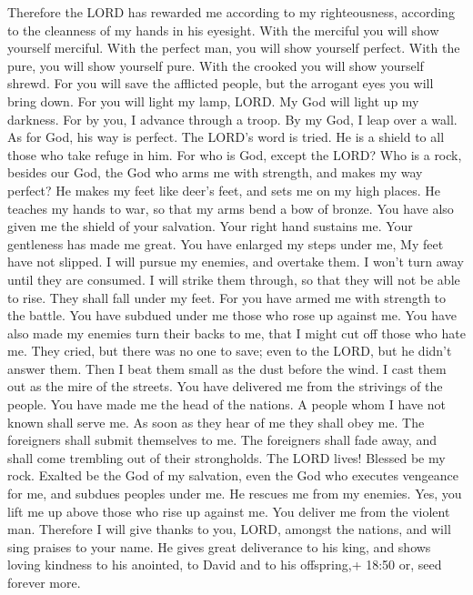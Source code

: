 Therefore the LORD has rewarded me according to my righteousness,
according to the cleanness of my hands in his eyesight. 
With the merciful you will show yourself merciful. With the perfect man,
you will show yourself perfect.  With the pure, you will
show yourself pure. With the crooked you will show yourself shrewd.
 For you will save the afflicted people, but the arrogant
eyes you will bring down.  For you will light my lamp,
LORD. My God will light up my darkness.  For by you, I
advance through a troop. By my God, I leap over a wall.  As
for God, his way is perfect. The LORD's word is tried. He is a shield to
all those who take refuge in him.  For who is God, except
the LORD? Who is a rock, besides our God,  the God who arms
me with strength, and makes my way perfect?  He makes my
feet like deer's feet, and sets me on my high places.  He
teaches my hands to war, so that my arms bend a bow of bronze.
 You have also given me the shield of your salvation. Your
right hand sustains me. Your gentleness has made me great. 
You have enlarged my steps under me, My feet have not slipped.
 I will pursue my enemies, and overtake them. I won't turn
away until they are consumed.  I will strike them through,
so that they will not be able to rise. They shall fall under my feet.
 For you have armed me with strength to the battle. You
have subdued under me those who rose up against me.  You
have also made my enemies turn their backs to me, that I might cut off
those who hate me.  They cried, but there was no one to
save; even to the LORD, but he didn't answer them.  Then I
beat them small as the dust before the wind. I cast them out as the mire
of the streets.  You have delivered me from the strivings
of the people. You have made me the head of the nations. A people whom I
have not known shall serve me.  As soon as they hear of me
they shall obey me. The foreigners shall submit themselves to me.
 The foreigners shall fade away, and shall come trembling
out of their strongholds.  The LORD lives! Blessed be my
rock. Exalted be the God of my salvation,  even the God who
executes vengeance for me, and subdues peoples under me. 
He rescues me from my enemies. Yes, you lift me up above those who rise
up against me. You deliver me from the violent man. 
Therefore I will give thanks to you, LORD, amongst the nations, and will
sing praises to your name.  He gives great deliverance to
his king, and shows loving kindness to his anointed, to David and to his
offspring,+ 18:50 or, seed forever more.

